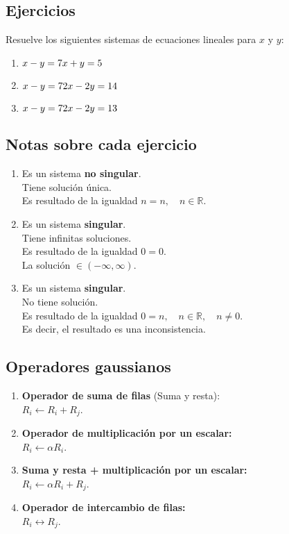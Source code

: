 \subsection*{Ejercicios}
\label{sec:0_ejercicios}

Resuelve los siguientes sistemas de ecuaciones lineales para $x$ y $y$:

\begin{enumerate}
    \item $x-y = 7 \\ x+y = 5$
    \item $x-y = 7 \\ 2x-2y = 14$
    \item $x-y = 7 \\ 2x-2y = 13$
\end{enumerate}

\subsection*{Notas sobre cada ejercicio}
\label{sec:0_notas_sobre_cada_ejercicio}

\begin{enumerate}
    \item Es un sistema \textbf{no singular}. \\ Tiene solución única. \\ Es resultado de la igualdad $n = n, \quad n \in \mathbb{R}$.
    \item Es un sistema \textbf{singular}. \\ Tiene infinitas soluciones. \\ Es resultado de la igualdad $0=0$. \\ La solución $\in (-\infty, \infty)$.
    \item Es un sistema \textbf{singular}. \\ No tiene solución. \\ Es resultado de la igualdad $0 = n, \quad n \in \mathbb{R}, \quad n \neq 0$. \\ Es decir, el resultado es una inconsistencia.
\end{enumerate}

\subsection*{Operadores gaussianos}
\label{sec:0_operadores_gaussianos}

\begin{enumerate}
    \item \textbf{Operador de suma de filas} (Suma y resta): \\ $R_{i} \leftarrow R_{i} + R_{j}$.
    \item \textbf{Operador de multiplicación por un escalar:} \\ $R_{i} \leftarrow \alpha R_{i}$.
    \item \textbf{Suma y resta + multiplicación por un escalar:} \\ $R_{i} \leftarrow \alpha R_{i} + R_{j}$.
    \item \textbf{Operador de intercambio de filas:} \\ $R_{i} \leftrightarrow R_{j}$.
\end{enumerate}

